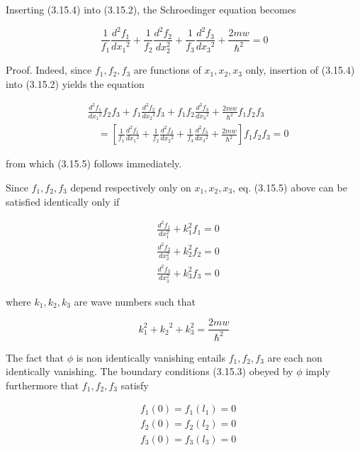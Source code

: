 \documentclass{article}
\begin{document}
Inserting (3.15.4) into (3.15.2), the Schroedinger equation becomes
 
\begin{equation*}
\frac{1}{f_{1}} \frac{d^{2} f_{1}}{d x_{1}{ }^{2}}+\frac{1}{f_{2}} \frac{d^{2} f_{2}}{d x_{2}^{2}}+\frac{1}{f_{3}} \frac{d^{2} f_{3}}{d x_{3}{ }^{2}}+\frac{2 m w}{\hbar^{2}}=0 \tag{3.15.5}
\end{equation*}
 

Proof. Indeed, since $f_{1}, f_{2}, f_{3}$ are functions of $x_{1}, x_{2}, x_{3}$ only, insertion of (3.15.4) into (3.15.2) yields the equation
 
\begin{align*}
& \frac{d^{2} f_{1}}{d x_{1}{ }^{2}} f_{2} f_{3}+f_{1} \frac{d^{2} f_{2}}{d x_{2}{ }^{2}} f_{3}+f_{1} f_{2} \frac{d^{2} f_{3}}{d x_{3}{ }^{2}}+\frac{2 m w}{\hbar^{2}} f_{1} f_{2} f_{3}  \tag{3.15.6}\\
& \quad=\left[\frac{1}{f_{1}} \frac{d^{2} f_{1}}{d x_{1}{ }^{2}}+\frac{1}{f_{2}} \frac{d^{2} f_{2}}{d x_{2}{ }^{2}}+\frac{1}{f_{3}} \frac{d^{2} f_{3}}{d x_{3}{ }^{2}}+\frac{2 m w}{\hbar^{2}}\right] f_{1} f_{2} f_{3}=0
\end{align*}
 
from which (3.15.5) follows immediately.

Since $f_{1}, f_{2}, f_{3}$ depend respectively only on $x_{1}, x_{2}, x_{3}$, eq. (3.15.5) above can be satisfied identically only if
 
\begin{align*}
& \frac{d^{2} f_{1}}{d x_{1}^{2}}+k_{1}^{2} f_{1}=0  \tag{3.15.7a}\\
& \frac{d^{2} f_{2}}{d x_{2}^{2}}+k_{2}^{2} f_{2}=0  \tag{3.15.7b}\\
& \frac{d^{2} f_{3}}{d x_{3}^{2}}+k_{3}^{2} f_{3}=0 \tag{3.15.7c}
\end{align*}
 
where $k_{1}, k_{2}, k_{3}$ are wave numbers such that
 
\begin{equation*}
k_{1}^{2}+{k_{2}}^{2}+k_{3}^{2}=\frac{2 m w}{\hbar^{2}} \tag{3.15.8}
\end{equation*}
 

The fact that $\phi$ is non identically vanishing entails $f_{1}, f_{2}, f_{3}$ are each non identically vanishing. The boundary conditions (3.15.3) obeyed by $\phi$ imply furthermore that $f_{1}, f_{2}, f_{3}$ satisfy
 
\begin{align*}
& f_{1}(0)=f_{1}\left(l_{1}\right)=0  \tag{3.15.9a}\\
& f_{2}(0)=f_{2}\left(l_{2}\right)=0  \tag{3.15.9b}\\
& f_{3}(0)=f_{3}\left(l_{3}\right)=0 \tag{3.15.9c}
\end{align*}
 
\end{document}
